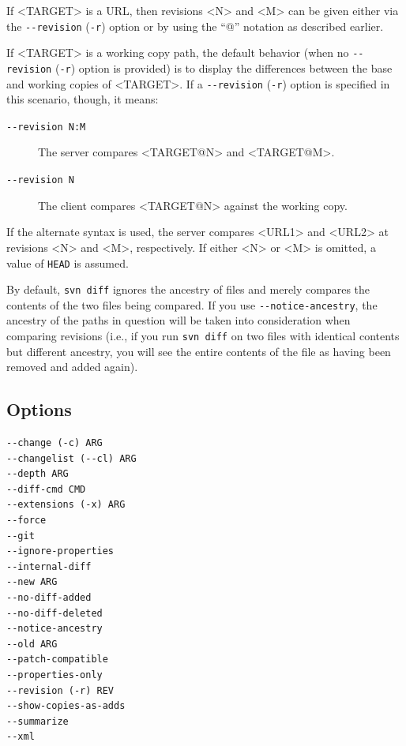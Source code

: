 If \textless TARGET\textgreater{} is a URL, then revisions
\textless N\textgreater{} and \textless M\textgreater{} can be given
either via the \texttt{-\/-revision} (\texttt{-r}) option or by using
the ``@'' notation as described earlier.

If \textless TARGET\textgreater{} is a working copy path, the default
behavior (when no \texttt{-\/-revision} (\texttt{-r}) option is
provided) is to display the differences between the base and working
copies of \textless TARGET\textgreater. If a \texttt{-\/-revision}
(\texttt{-r}) option is specified in this scenario, though, it means:

\begin{description}
\item[\texttt{-\/-revision\ N:M}]
The server compares \textless TARGET@N\textgreater{} and
\textless TARGET@M\textgreater.
\item[\texttt{-\/-revision\ N}]
The client compares \textless TARGET@N\textgreater{} against the working
copy.
\end{description}

If the alternate syntax is used, the server compares
\textless URL1\textgreater{} and \textless URL2\textgreater{} at
revisions \textless N\textgreater{} and \textless M\textgreater,
respectively. If either \textless N\textgreater{} or
\textless M\textgreater{} is omitted, a value of \texttt{HEAD} is
assumed.

By default, \texttt{svn\ diff} ignores the ancestry of files and merely
compares the contents of the two files being compared. If you use
\texttt{-\/-notice-ancestry}, the ancestry of the paths in question will
be taken into consideration when comparing revisions (i.e., if you run
\texttt{svn\ diff} on two files with identical contents but different
ancestry, you will see the entire contents of the file as having been
removed and added again).

\subsection{Options}

\begin{verbatim}
--change (-c) ARG
--changelist (--cl) ARG
--depth ARG
--diff-cmd CMD
--extensions (-x) ARG
--force
--git
--ignore-properties
--internal-diff
--new ARG
--no-diff-added
--no-diff-deleted
--notice-ancestry
--old ARG
--patch-compatible
--properties-only
--revision (-r) REV
--show-copies-as-adds
--summarize
--xml
\end{verbatim}

